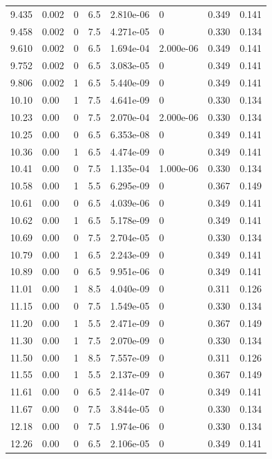 \documentclass[preview]{standalone}
\begin{document}
{{{\begin{tabular}{L{1.2cm}C{1.2cm} C{0.3cm}C{0.5cm} C{1.4cm}C{1.4cm} C{1.4cm}C{1.4cm}}
  9.435  &  0.002  & 0     & 6.5 &  2.810e-06  & 0  & 0.349 &  0.141   \\ 
  9.458  &  0.002  & 0     & 7.5 &  4.271e-05  & 0  & 0.330 &  0.134   \\ 
  9.610  &  0.002  & 0     & 6.5 &  1.694e-04  & 2.000e-06  & 0.349 &  0.141   \\ 
  9.752  &  0.002  & 0     & 6.5 &  3.083e-05  & 0  & 0.349 &  0.141   \\ 
  9.806  &  0.002  & 1     & 6.5 &  5.440e-09  & 0  & 0.349 &  0.141   \\ 
  10.10  &  0.00  & 1     & 7.5 &  4.641e-09  & 0  & 0.330 &  0.134   \\ 
  10.23  &  0.00  & 0     & 7.5 &  2.070e-04  & 2.000e-06  & 0.330 &  0.134   \\ 
  10.25  &  0.00  & 0     & 6.5 &  6.353e-08  & 0  & 0.349 &  0.141   \\ 
  10.36  &  0.00  & 1     & 6.5 &  4.474e-09  & 0  & 0.349 &  0.141   \\ 
  10.41  &  0.00  & 0     & 7.5 &  1.135e-04  & 1.000e-06  & 0.330 &  0.134   \\ 
  10.58  &  0.00  & 1     & 5.5 &  6.295e-09  & 0  & 0.367 &  0.149   \\ 
  10.61  &  0.00  & 0     & 6.5 &  4.039e-06  & 0  & 0.349 &  0.141   \\ 
  10.62  &  0.00  & 1     & 6.5 &  5.178e-09  & 0  & 0.349 &  0.141   \\ 
  10.69  &  0.00  & 0     & 7.5 &  2.704e-05  & 0  & 0.330 &  0.134   \\ 
  10.79  &  0.00  & 1     & 6.5 &  2.243e-09  & 0  & 0.349 &  0.141   \\ 
  10.89  &  0.00  & 0     & 6.5 &  9.951e-06  & 0  & 0.349 &  0.141   \\ 
  11.01  &  0.00  & 1     & 8.5 &  4.040e-09  & 0  & 0.311 &  0.126   \\ 
  11.15  &  0.00  & 0     & 7.5 &  1.549e-05  & 0  & 0.330 &  0.134   \\ 
  11.20  &  0.00  & 1     & 5.5 &  2.471e-09  & 0  & 0.367 &  0.149   \\ 
  11.30  &  0.00  & 1     & 7.5 &  2.070e-09  & 0  & 0.330 &  0.134   \\ 
  11.50  &  0.00  & 1     & 8.5 &  7.557e-09  & 0  & 0.311 &  0.126   \\ 
  11.55  &  0.00  & 1     & 5.5 &  2.137e-09  & 0  & 0.367 &  0.149   \\ 
  11.61  &  0.00  & 0     & 6.5 &  2.414e-07  & 0  & 0.349 &  0.141   \\ 
  11.67  &  0.00  & 0     & 7.5 &  3.844e-05  & 0  & 0.330 &  0.134   \\ 
  12.18  &  0.00  & 0     & 7.5 &  1.974e-06  & 0  & 0.330 &  0.134   \\ 
  12.26  &  0.00  & 0     & 6.5 &  2.106e-05  & 0  & 0.349 &  0.141   \\ 
\hline 
\end{tabular} 

}}}
\end{document}
